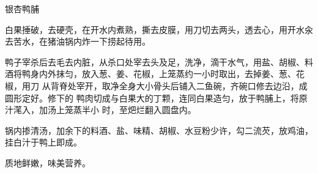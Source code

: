 %
%
%
%
%
%
%
\begin{recipe}{银杏鸭脯}

\ingredients


\preparation

\step 白果捶破，去硬壳，在开水内煮熟，撕去皮膜，用刀切去两头，透去心，用开水汆
去苦水，在猪油锅内炸一下捞起待用。

\step 鸭子宰杀后去毛去内脏，从杀口处宰去头及足，洗净，滴干水气，用盐、胡椒、料
酒将鸭身内外抹匀，放入葱、姜、花椒，上笼蒸约一小时取出，去掉姜、葱、花椒，用刀
从背脊处宰开，取净全身大小骨头后铺入二鱼碗，齐碗口修去边沿，成圆形定好。修下的
鸭肉切成与白果大的丁颗，连同白果造匀，放于鸭脯上，将原汁滗入，加汤上笼蒸半小
时，至𤆵烂翻入圆盘内。

\step 锅内掺清汤，加余下的料酒、盐、味精、胡椒、水豆粉少许，勾二流芡，放鸡油，
挂白汁于鸭上即成。

\features

质地鲜嫩，味美营养。

\end{recipe}

